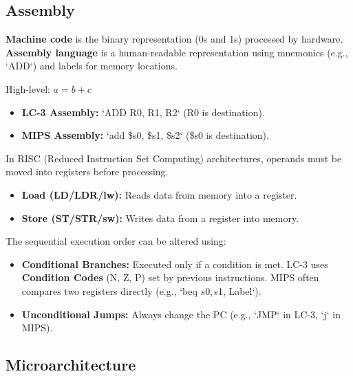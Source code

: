 \subsection{Assembly}

\begin{definition}
	\textbf{Machine code} is the binary representation (0s and 1s) processed by hardware. \textbf{Assembly language} is a human-readable representation using mnemonics (e.g., `ADD`) and labels for memory locations.
\end{definition}

\begin{example}
	High-level: $a = b + c$
	\begin{itemize}
		\item \textbf{LC-3 Assembly:} `ADD R0, R1, R2` (R0 is destination).
		\item \textbf{MIPS Assembly:} `add \$s0, \$s1, \$s2` (\$s0 is destination).
	\end{itemize}
\end{example}

\begin{important}
	In RISC (Reduced Instruction Set Computing) architectures, operands must be moved into registers before processing.
	\begin{itemize}
		\item \textbf{Load (LD/LDR/lw):} Reads data from memory into a register.
		\item \textbf{Store (ST/STR/sw):} Writes data from a register into memory.
	\end{itemize}
\end{important}

\begin{remark}
	The sequential execution order can be altered using:
	\begin{itemize}
		\item \textbf{Conditional Branches:} Executed only if a condition is met. LC-3 uses \textbf{Condition Codes} (N, Z, P) set by previous instructions. MIPS often compares two registers directly (e.g., `beq $s0, $s1, Label`).
		\item \textbf{Unconditional Jumps:} Always change the PC (e.g., `JMP` in LC-3, `j` in MIPS).
	\end{itemize}
\end{remark}

\subsection{Microarchitecture}

